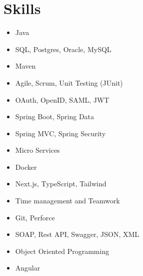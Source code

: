 \documentclass[a4paper, 10pt]{article}
\newcommand{\resumeItemNoSub}[1]{\item\small{{#1}}}
\newcommand{\resumeSubHeadingListStart}{\begin{itemize}[leftmargin=*]}
\newcommand{\resumeSubHeadingListEnd}{\end{itemize}}
\begin{document}


\section{Skills}
\vspace{-10pt}
\begin{multicols}{3}
{
  \resumeSubHeadingListStart
  \item{Java}
  \item{SQL, Postgres, Oracle, MySQL}
  \item{Maven}
  \item{Agile, Scrum, Unit Testing (JUnit)}
  \item{OAuth, OpenID, SAML, JWT}

  \item{Spring Boot, Spring Data}
  \item{Spring MVC, Spring Security}
  \item{Micro Services}
  \item{Docker}
  \item{Next.js, TypeScript, Tailwind}

  \item{Time management and Teamwork}
  \item{Git, Perforce}
  \item{SOAP, Rest API, Swagger, JSON, XML}
  \item{Object Oriented Programming}
  \item{Angular}
  
  \resumeSubHeadingListEnd
}
\end{multicols}

\end{document}
